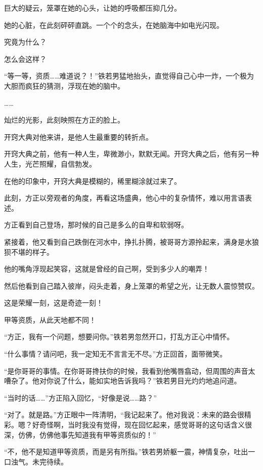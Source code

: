 \begin{this_body}
巨大的疑云，笼罩在她的心头，让她的呼吸都压抑几分。

她的心脏，在此刻砰砰直跳。一个个的念头，在她脑海中如电光闪现。

究竟为什么？

怎么会这样？

“等一等，资质……难道说？！”铁若男猛地抬头，直觉得自己心中一炸，一个极为大胆而疯狂的猜测，浮现在她的脑中。

……

灿烂的光影，此刻映照在方正的脸上。

开窍大典对他来讲，是他人生最重要的转折点。

开窍大典之前，他有一种人生，卑微渺小，默默无闻。开窍大典之后，他有另一种人生，光芒照耀，自信勃发。

在他的印象中，开窍大典是模糊的，稀里糊涂就过来了。

此刻，方正以旁观者的角度，再看这场盛典，他心中的复杂情怀，难以用言语表述。

方正看到自己登场，那时候的自己是多么的自卑和软弱呀。

紧接着，他又看到自己跌倒在河水中，挣扎扑腾，被哥哥方源拎起来，满身是水狼狈不堪的样子。

他的嘴角浮现起笑容，这就是曾经的自己啊，受到多少人的嘲弄！

然后他看到自己踏入彼岸，闷头走着，身上笼罩的希望之光，让无数人震惊赞叹。

这是荣耀一刻，这是奇迹一刻！

甲等资质，从此天地都不同！

“方正，我有一个问题，想要问你。”铁若男忽然开口，打乱方正心中情怀。

“什么事情？请问吧，我一定知无不言言无不尽。”方正回首，面带微笑。

“是你哥哥的事情。在你哥哥搀扶你的时候，我看到他嘴唇翕动，但周围的声音太嘈杂了。他对你说了什么，能如实地告诉我吗？”铁若男目光灼灼地追问道。

“当时的话……”方正陷入回忆，“好像是说……路？”

“对了。就是路。”方正眼中一阵清明，“我记起来了。他对我说：未来的路会很精彩。嗯？好奇怪啊，当时我没有觉得，现在回忆起来，感觉哥哥的这句话含义很深，仿佛，仿佛他事先知道我有甲等资质似的！”

“不，他不是知道甲等资质，而是另有所指。”铁若男娇躯一震，神情复杂，吐出一口浊气。未完待续。

\end{this_body}

